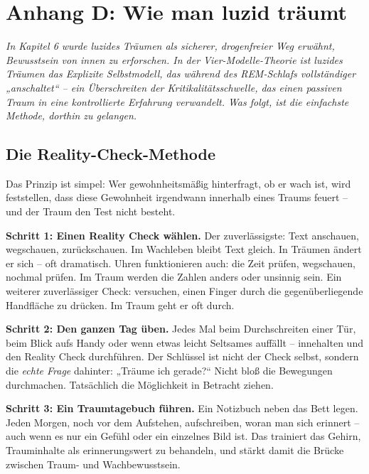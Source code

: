 \documentclass[11pt, twoside, openright]{book}
\begin{document}
\chapter*{Anhang D: Wie man luzid träumt}

\textit{In Kapitel 6 wurde luzides Träumen als sicherer, drogenfreier Weg erwähnt, Bewusstsein von innen zu erforschen. In der Vier-Modelle-Theorie ist luzides Träumen das Explizite Selbstmodell, das während des REM-Schlafs vollständiger „anschaltet“ -- ein Überschreiten der Kritikalitätsschwelle, das einen passiven Traum in eine kontrollierte Erfahrung verwandelt. Was folgt, ist die einfachste Methode, dorthin zu gelangen.}

\section*{Die Reality-Check-Methode}

Das Prinzip ist simpel: Wer gewohnheitsmäßig hinterfragt, ob er wach ist, wird feststellen, dass diese Gewohnheit irgendwann innerhalb eines Traums feuert -- und der Traum den Test nicht besteht.

\textbf{Schritt 1: Einen Reality Check wählen.} Der zuverlässigste: Text anschauen, wegschauen, zurückschauen. Im Wachleben bleibt Text gleich. In Träumen ändert er sich -- oft dramatisch. Uhren funktionieren auch: die Zeit prüfen, wegschauen, nochmal prüfen. Im Traum werden die Zahlen anders oder unsinnig sein. Ein weiterer zuverlässiger Check: versuchen, einen Finger durch die gegenüberliegende Handfläche zu drücken. Im Traum geht er oft durch.

\textbf{Schritt 2: Den ganzen Tag üben.} Jedes Mal beim Durchschreiten einer Tür, beim Blick aufs Handy oder wenn etwas leicht Seltsames auffällt -- innehalten und den Reality Check durchführen. Der Schlüssel ist nicht der Check selbst, sondern die \textit{echte Frage} dahinter: „Träume ich gerade?“ Nicht bloß die Bewegungen durchmachen. Tatsächlich die Möglichkeit in Betracht ziehen.

\textbf{Schritt 3: Ein Traumtagebuch führen.} Ein Notizbuch neben das Bett legen. Jeden Morgen, noch vor dem Aufstehen, aufschreiben, woran man sich erinnert -- auch wenn es nur ein Gefühl oder ein einzelnes Bild ist. Das trainiert das Gehirn, Trauminhalte als erinnerungswert zu behandeln, und stärkt damit die Brücke zwischen Traum- und Wachbewusstsein.
\end{document}
